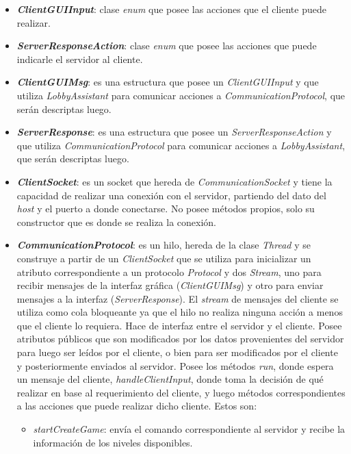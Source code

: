 \begin{itemize}
	\item \textbf{\textit{ClientGUIInput}}: clase \textit{enum} que posee las acciones que el cliente puede realizar.
	
	\item \textbf{\textit{ServerResponseAction}}: clase \textit{enum} que posee las acciones que puede indicarle el servidor al cliente.
	
	\item \textbf{\textit{ClientGUIMsg}}: es una estructura que posee un \textit{ClientGUIInput} y que utiliza \textit{LobbyAssistant} para comunicar acciones a \textit{CommunicationProtocol}, que serán descriptas luego.
	
	\item \textbf{\textit{ServerResponse}}: es una estructura que posee un \textit{ServerResponseAction} y que utiliza \textit{CommunicationProtocol} para comunicar acciones a \textit{LobbyAssistant}, que serán descriptas luego.

	\item \textbf{\textit{ClientSocket}}: es un socket que hereda de \textit{CommunicationSocket} y tiene la capacidad de realizar una conexión con el servidor, partiendo del dato del \textit{host} y el puerto a donde conectarse. No posee métodos propios, solo su constructor que es donde se realiza la conexión.
	
	\item \textbf{\textit{CommunicationProtocol}}: es un hilo, hereda de la clase \textit{Thread} y se construye a partir de un \textit{ClientSocket} que se utiliza para inicializar un atributo correspondiente a un protocolo \textit{Protocol} y dos \textit{Stream}, uno para recibir mensajes de la interfaz gráfica (\textit{ClientGUIMsg}) y otro para enviar mensajes a la interfaz (\textit{ServerResponse}). El \textit{stream} de mensajes del cliente se utiliza como cola bloqueante ya que el hilo no realiza ninguna acción a menos que el cliente lo requiera. Hace de interfaz entre el servidor y el cliente. Posee atributos públicos que son modificados por los datos provenientes del servidor para luego ser leídos por el cliente, o bien para ser modificados por el cliente y posteriormente enviados al servidor. Posee los métodos \textit{run}, donde espera un mensaje del cliente, \textit{handleClientInput}, donde toma la decisión de qué realizar en base al requerimiento del cliente, y luego métodos correspondientes a las acciones que puede realizar dicho cliente. Estos son: \begin{itemize}
		\item \textit{startCreateGame}: envía el comando correspondiente al servidor y recibe la información de los niveles disponibles.
		

\end{itemize}
\end{itemize}
